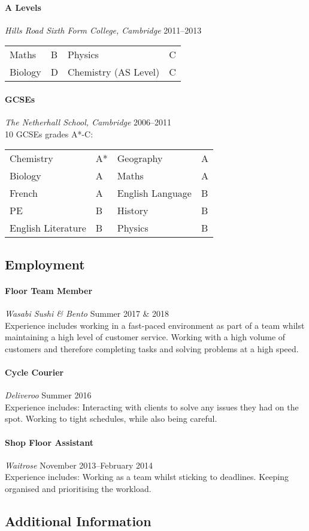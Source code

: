 \documentclass[11pt,a4paper]{article}
\newcommand{\centry}[3]{\paragraph{#1} \textit{#2}%
\hfill#3\\[2pt]}
\begin{document}
\centry{A Levels}{Hills Road Sixth Form College, Cambridge} {2011--2013}
\begin{center}
  \begin{tabular}{llll}
    Maths & B & Physics & C \\
    Biology & D  & Chemistry (AS Level) & C\\
  \end{tabular}
\end{center}

\centry{GCSEs}{The Netherhall School, Cambridge}{2006--2011} 
10 GCSEs grades A*-C:
\begin{center}
  \begin{tabular}{llll}
    Chemistry & A* & Geography & A \\
    Biology& A & Maths& A \\
    French& A & English Language& B \\
    PE& B &  History& B\\
    English Literature& B & Physics& B\\
  \end{tabular}
\end{center}

\subsection*{Employment}

\centry{Floor Team Member}{Wasabi Sushi \& Bento}{Summer 2017 \& 2018}

Experience includes working in a fast-paced environment as part of a team whilst 
maintaining a high level of customer service. Working with a high volume of 
customers and therefore completing tasks and solving problems at a high speed. 

\centry{Cycle Courier}{Deliveroo}{Summer 2016}

Experience includes: Interacting with clients to solve any issues they had on 
the spot. Working to tight schedules, while also being careful. 


\centry{Shop Floor Assistant}{Waitrose}{November 2013--February 2014}

Experience includes: Working as a team whilst sticking to deadlines. 
Keeping organised and prioritising the workload.

\subsection*{Additional Information}
\end{document}
